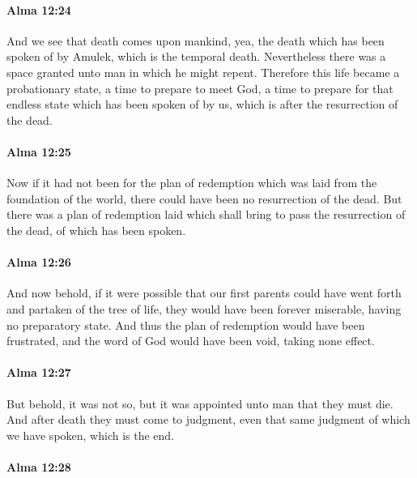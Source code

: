 		\paragraph{Alma 12:24} %
			\label{ALMA-12-24}

			And we see that death comes upon mankind,
			yea, the death which has been spoken of by Amulek,
			which is the temporal death.
			Nevertheless there was a space granted unto man in which he might repent.
			Therefore this life became a probationary state,
			a time to prepare to meet God,
			a time to prepare for that endless state
			which has been spoken of by us,
			which is after the resurrection of the dead.

		\paragraph{Alma 12:25} %
			\label{ALMA-12-25}

			Now if it had not been for the plan of redemption
			which was laid from the foundation of the world,
			there could have been no resurrection of the dead.
			But there was a plan of redemption laid
			which shall bring to pass the resurrection of the dead,
			of which has been spoken.

		\paragraph{Alma 12:26} %
			\label{ALMA-12-26}

			And now behold, if it were possible
			that our first parents could have went forth and partaken of the tree of life,
			they would have been forever miserable,
			having no preparatory state.
			And thus the plan of redemption would have been frustrated,
			and the word of God would have been void,
			taking none effect.

		\paragraph{Alma 12:27} %
			\label{ALMA-12-27}

			But behold, it was not so,
			but it was appointed unto man that they must die.
			And after death they must come to judgment,
			even that same judgment of which we have spoken,
			which is the end.

		\paragraph{Alma 12:28} %
			\label{ALMA-12-28}

